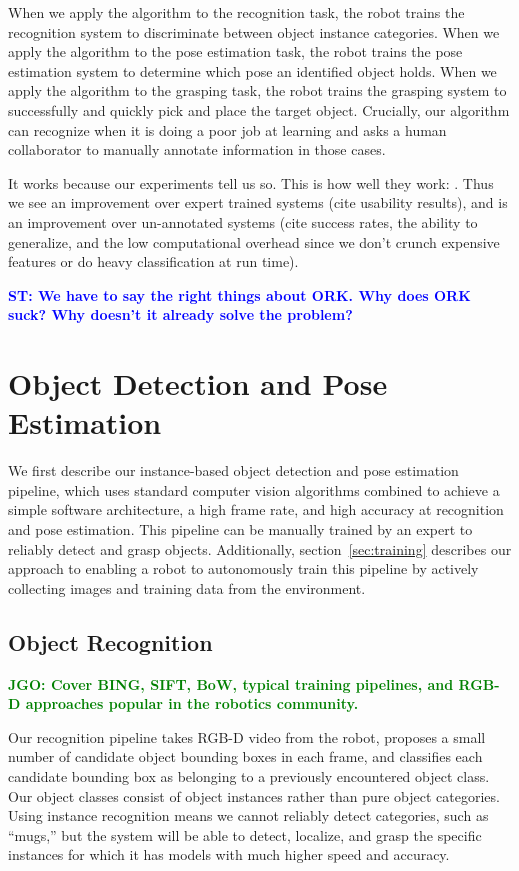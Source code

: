 \documentclass[conference]{IEEEtran}
\newcommand{\stnote}[1]{\textcolor{Blue}{\textbf{ST: #1}}}
\newcommand{\jgonote}[1]{\textcolor{Green}{\textbf{JGO: #1}}}
\begin{document}
When we apply the algorithm to the recognition task, the robot trains
the recognition system to discriminate between object instance
categories. When we apply the algorithm to the pose estimation task,
the robot trains the pose estimation system to determine which pose an
identified object holds.  When we apply the algorithm to the grasping
task, the robot trains the grasping system to successfully and quickly
pick and place the target object.  Crucially, our algorithm can
recognize when it is doing a poor job at learning and asks a human
collaborator to manually annotate information in those cases.



It works because our experiments tell us so. This is how well they
work: .  Thus we see an improvement over expert trained systems (cite
usability results), and is an improvement over un-annotated systems
(cite success rates, the ability to generalize, and the low
computational overhead since we don't crunch expensive features or do
heavy classification at run time).

\stnote{We have to say the right things about ORK.  Why does ORK suck?
  Why doesn't it already solve the problem?}


\section{Object Detection and Pose Estimation}

We first describe our instance-based object detection and pose
estimation pipeline, which uses standard computer vision algorithms
combined to achieve a simple software architecture, a high frame rate,
and high accuracy at recognition and pose estimation.  This pipeline
can be manually trained by an expert to reliably detect and grasp
objects.  Additionally, section~\ref{sec:training} describes our
approach to enabling a robot to autonomously train this pipeline by
actively collecting images and training data from the environment.

\subsection{Object Recognition}
\jgonote{Cover BING, SIFT, BoW, typical training pipelines, and RGB-D
  approaches popular in the robotics community.} 

Our recognition pipeline takes RGB-D video from the robot, proposes a
small number of candidate object bounding boxes in each frame, and
classifies each candidate bounding box as belonging to a previously
encountered object class. Our object classes consist of object
instances rather than pure object categories.  Using instance
recognition means we cannot reliably detect categories, such as
``mugs,'' but the system will be able to detect, localize, and grasp
the specific instances for which it has models with much higher speed
and accuracy.
\end{document}
